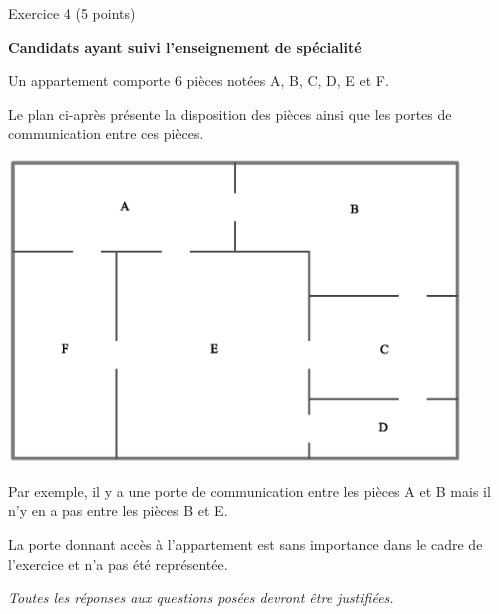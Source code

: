 
%
\begin{h2}Exercice 4 (5 points)\end{h2}
\par
\textbf{Candidats ayant suivi l'enseignement de spécialité}
\par
Un appartement comporte 6 pièces notées A, B, C, D, E et F.
\par
Le plan ci-après présente la disposition des pièces ainsi que les portes de communication entre ces pièces.
\par
\begin{center}
     \begin{extern}%
          \includegraphics[width=0.9\textwidth]{images/BBESL-spe-1-1}%
     \end{extern}
\end{center}
\par
Par exemple, il y a une porte de communication entre les pièces A et B mais il n'y en a pas entre les pièces B et E.
\par
La porte donnant accès à l'appartement est sans importance dans le cadre de l'exercice et n'a pas été représentée.
\par
\textit{Toutes les réponses aux questions posées devront être justifiées.}
\par
